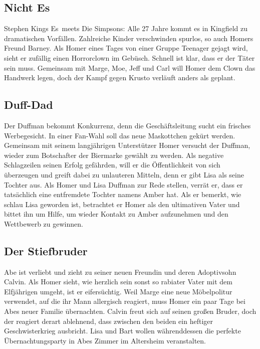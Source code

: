 \subsection{Nicht Es}
Stephen Kings \glqq Es\grqq\ meets \glqq Die Simpsons\grqq : Alle 27 Jahre kommt es in Kingfield zu dramatischen Vorfällen. Zahlreiche Kinder verschwinden spurlos, so auch Homers Freund Barney. Als Homer eines Tages von einer Gruppe Teenager gejagt wird, sieht er zufällig einen Horrorclown im Gebüsch. Schnell ist klar, dass er der Täter sein muss. Gemeinsam mit Marge, Moe, Jeff und Carl will Homer dem Clown das Handwerk legen, doch der Kampf gegen Krusto verläuft anders als geplant.


\subsection{Duff-Dad}
Der Duffman bekommt Konkurrenz, denn die Geschäftsleitung sucht ein frisches Werbegesicht. In einer Fan-Wahl soll das neue Maskottchen gekürt werden. Gemeinsam mit seinem langjährigen Unterstützer Homer versucht der Duffman, wieder zum Botschafter der Biermarke gewählt zu werden. Als negative Schlagzeilen seinen Erfolg gefährden, will er die Öffentlichkeit von sich überzeugen und greift dabei zu unlauteren Mitteln, denn er gibt Lisa als seine Tochter aus. Als Homer und Lisa Duffman zur Rede stellen, verrät er, dass er tatsächlich eine entfremdete Tochter namens Amber hat. Als er bemerkt, wie schlau Lisa geworden ist, betrachtet er Homer als den ultimativen Vater und bittet ihn um Hilfe, um wieder Kontakt zu Amber aufzunehmen und den Wettbewerb zu gewinnen.


\subsection{Der Stiefbruder}
Abe ist verliebt und zieht zu seiner neuen Freundin und deren Adoptivsohn Calvin. Als Homer sieht, wie herzlich sein sonst so rabiater Vater mit dem Elfjährigen umgeht, ist er eifersüchtig. Weil Marge eine neue Möbelpolitur verwendet, auf die ihr Mann allergisch reagiert, muss Homer ein paar Tage bei Abes neuer Familie übernachten. Calvin freut sich auf seinen großen Bruder, doch der reagiert derart ablehnend, dass zwischen den beiden ein heftiger Geschwisterkrieg ausbricht. Lisa und Bart wollen währenddessen die perfekte Übernachtungsparty in Abes Zimmer im Altersheim veranstalten.

